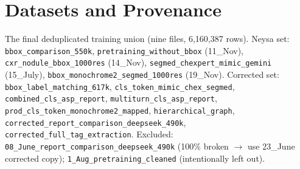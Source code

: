 \documentclass[11pt,a4paper]{article}
\begin{document}
\section{Datasets and Provenance}
\label{app:datasets}
The final deduplicated training union (nine files, 6{,}160{,}387 rows). Neysa set: \texttt{bbox\_comparison\_550k}, \texttt{pretraining\_without\_bbox} (11\_Nov), \texttt{cxr\_nodule\_bbox\_1000res} (14\_Nov), \texttt{segmed\_chexpert\_mimic\_gemini} (15\_July), \texttt{bbox\_monochrome2\_segmed\_1000res} (19\_Nov). Corrected set: \texttt{bbox\_label\_matching\_617k}, \texttt{cls\_token\_mimic\_chex\_segmed}, \texttt{combined\_cls\_asp\_report}, \texttt{multiturn\_cls\_asp\_report}, \texttt{prod\_cls\_token\_monochrome2\_mapped}, \texttt{hierarchical\_graph}, \texttt{corrected\_report\_comparison\_deepseek\_490k}, \texttt{corrected\_full\_tag\_extraction}. Excluded: \texttt{08\_June\_report\_comparison\_deepseek\_490k} (100\% broken $\rightarrow$ use 23\_June corrected copy); \texttt{1\_Aug\_pretraining\_cleaned} (intentionally left out).
\end{document}
